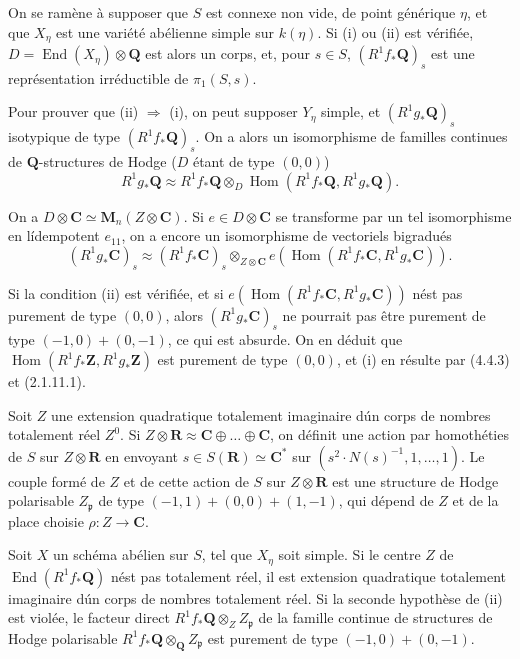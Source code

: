 \documentclass[11pt]{amsart}
\theoremstyle{plain}
\theoremstyle{remark}
\DeclareMathOperator{\Hom}{Hom}
\DeclareMathOperator{\End}{End}
\newcommand{\Q}{\mathbf{Q}}
\newcommand{\Z}{\mathbf{Z}}
\newcommand{\C}{\mathbf{C}}
\begin{document}
On se ram\`ene \`a supposer que $S$ est connexe non vide, de point g\'en\'erique $\eta$, et
que $X_{\eta}$ est une vari\'et\'e ab\'elienne simple sur $k(\eta)$. Si (i) ou (ii) est v\'erifi\'ee,
$D = \End(X_{\eta}) \otimes \Q$ est alors un corps, et, pour $s \in S$, $(R^{1}f_{*}\Q)_{s}$ est une
repr\'esentation irr\'eductible de $\pi_{1}(S,s)$.

Pour prouver que (ii) $\Rightarrow$ (i), on peut supposer $Y_{\eta}$ simple, et $(R^{1}g_{*}\Q)_{s}$
isotypique de type $(R^{1}f_{*}\Q)_{s}$. On a alors un isomorphisme de familles continues de
$\Q$-structures de Hodge ($D$ \'etant de type $(0,0)$)
\[
R^{1}g_{*}\Q \approx R^{1}f_{*}\Q \otimes_{D} \Hom(R^{1}f_{*}\Q, R^{1}g_{*}\Q).
\]

On a $D \otimes \C \simeq \mathbf{M}_{n}(Z \otimes \C)$. Si $e \in D \otimes \C$ se transforme par un tel
isomorphisme en l\'idempotent $e_{11}$, on a encore un isomorphisme de vectoriels bigradu\'es
\[
(R^{1}g_{*}\C)_{s} \approx (R^{1}f_{*}\C)_{s} \otimes_{Z \otimes \C} e(\Hom(R^{1}f_{*}\C, R^{1}g_{*}\C)).
\]

Si la condition (ii) est v\'erifi\'ee, et si $e(\Hom(R^{1}f_{*}\C, R^{1}g_{*}\C))$ n\'est pas
purement de type $(0,0)$, alors $(R^{1}g_{*}\C)_{s}$ ne pourrait pas \^etre purement de type
$(-1,0)+(0,-1)$, ce qui est absurde. On en d\'eduit que $\Hom(R^{1}f_{*}\Z, R^{1}g_{*}\Z)$ est
purement de type $(0,0)$, et (i) en r\'esulte par (4.4.3) et (2.1.11.1).

Soit $Z$ une extension quadratique totalement imaginaire d\'un corps de nombres totalement
r\'eel $Z^{0}$. Si $Z \otimes \mathbf{R} \approx \C \oplus \ldots \oplus \C$, on d\'efinit une action par
homoth\'eties de $S$ sur $Z \otimes \mathbf{R}$ en envoyant
$s \in S(\mathbf{R}) \simeq \C^{*}$ sur $(s^{2} \cdot N(s)^{-1}, 1, \ldots, 1)$. Le couple form\'e de $Z$
et de cette action de $S$ sur $Z \otimes \mathbf{R}$ est une structure de Hodge polarisable
$Z_{\mathfrak{p}}$ de type $(-1,1)+(0,0)+(1,-1)$, qui d\'epend de $Z$ et de la place choisie
$\rho : Z \to \C$.

Soit $X$ un sch\'ema ab\'elien sur $S$, tel que $X_{\eta}$ soit simple. Si le centre $Z$ de
$\End(R^{1}f_{*}\Q)$ n\'est pas totalement r\'eel, il est extension quadratique totalement
imaginaire d\'un corps de nombres totalement r\'eel. Si la seconde hypoth\`ese de (ii) est
viol\'ee, le facteur direct $R^{1}f_{*}\Q \otimes_{Z} Z_{\mathfrak{p}}$ de la famille continue de
structures de Hodge polarisable $R^{1}f_{*}\Q \otimes_{\Q} Z_{\mathfrak{p}}$ est purement de type
$(-1,0)+(0,-1)$.
\end{document}
